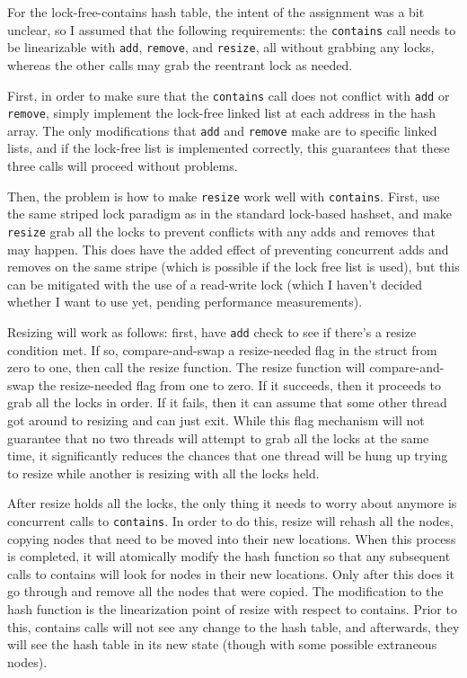 \documentclass{article}
\begin{document}
For the lock-free-contains hash table, the intent of the assignment was a bit unclear, so I assumed that the following requirements: the \verb|contains| call needs to be linearizable with \verb|add|, \verb|remove|, and \verb|resize|, all without grabbing any locks, whereas the other calls may grab the reentrant lock as needed. 

First, in order to make sure that the \verb|contains| call does not conflict with \verb|add| or \verb|remove|, simply implement the lock-free linked list at each address in the hash array. The only modifications that \verb|add| and \verb|remove| make are to specific linked lists, and if the lock-free list is implemented correctly, this guarantees that these three calls will proceed without problems.

Then, the problem is how to make \verb|resize| work well with \verb|contains|. First, use the same striped lock paradigm as in the standard lock-based hashset, and make \verb|resize| grab all the locks to prevent conflicts with any adds and removes that may happen. This does have the added effect of preventing concurrent adds and removes on the same stripe (which is possible if the lock free list is used), but this can be mitigated with the use of a read-write lock (which I haven't decided whether I want to use yet, pending performance measurements).

Resizing will work as follows: first, have \verb|add| check to see if there's a resize condition met. If so, compare-and-swap a resize-needed flag in the struct from zero to one, then call the resize function. The resize function will compare-and-swap the resize-needed flag from one to zero. If it succeeds, then it proceeds to grab all the locks in order. If it fails, then it can assume that some other thread got around to resizing and can just exit. While this flag mechanism will not guarantee that no two threads will attempt to grab all the locks at the same time, it significantly reduces the chances that one thread will be hung up trying to resize while another is resizing with all the locks held.

After resize holds all the locks, the only thing it needs to worry about anymore is concurrent calls to \verb|contains|. In order to do this, resize will rehash all the nodes, copying nodes that need to be moved into their new locations. When this process is completed, it will atomically modify the hash function so that any subsequent calls to contains will look for nodes in their new locations. Only after this does it go through and remove all the nodes that were copied. The modification to the hash function is the linearization point of resize with respect to contains. Prior to this, contains calls will not see any change to the hash table, and afterwards, they will see the hash table in its new state (though with some possible extraneous nodes).
\end{document}
